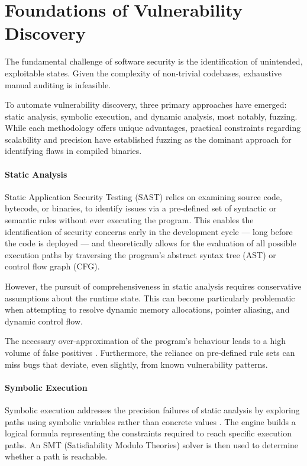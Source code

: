 \chapter{Foundations of Vulnerability Discovery}
\label{ch:bg}

The fundamental challenge of software security is the identification of unintended, exploitable states. Given the complexity of non-trivial codebases, exhaustive manual auditing is infeasible.

To automate vulnerability discovery, three primary approaches have emerged: static analysis, symbolic execution, and dynamic analysis, most notably, fuzzing. While each methodology offers unique advantages, practical constraints regarding scalability and precision have established fuzzing as the dominant approach for identifying flaws in compiled binaries.

\subsubsection{Static Analysis}

Static Application Security Testing (SAST) relies on examining source code, bytecode, or binaries, to identify issues via a pre-defined set of syntactic or semantic rules without ever executing the program. This enables the identification of security concerns early in the development cycle --- long before the code is deployed --- and theoretically allows for the evaluation of all possible execution paths by traversing the program's abstract syntax tree (AST) or control flow graph (CFG).

However, the pursuit of comprehensiveness in static analysis requires conservative assumptions about the runtime state. This can become particularly problematic when attempting to resolve dynamic memory allocations, pointer aliasing, and dynamic control flow. 

The necessary over-approximation of the program's behaviour leads to a high volume of false positives \cite{nachtigall2022large}. Furthermore, the reliance on pre-defined rule sets can miss bugs that deviate, even slightly, from known vulnerability patterns.

\subsubsection{Symbolic Execution}
 
Symbolic execution addresses the precision failures of static analysis by exploring paths using symbolic variables rather than concrete values \cite{king1976symbolic}. The engine builds a logical formula representing the constraints required to reach specific execution paths. An SMT (Satisfiability Modulo Theories) solver is then used to determine whether a path is reachable. 

